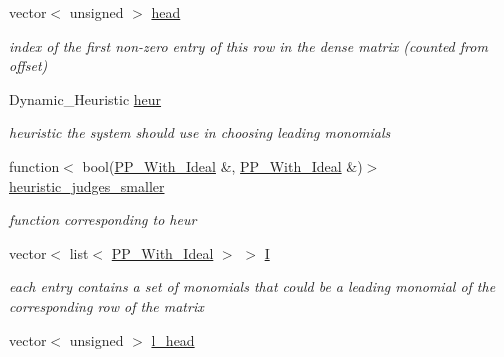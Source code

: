\begin{DoxyCompactItemize}
vector$<$ unsigned $>$ \hyperlink{group___g_b_computation_a1679f8bda319a602672bc866220bb7fb}{head}
\begin{DoxyCompactList}\small\item\em index of the first non-\/zero entry of this row in the dense matrix (counted from offset) \end{DoxyCompactList}\item 
\mbox{\label{group___g_b_computation_a31a62db75649e409aa5b9f374c260ba5}} 
Dynamic\+\_\+\+Heuristic \hyperlink{group___g_b_computation_a31a62db75649e409aa5b9f374c260ba5}{heur}
\begin{DoxyCompactList}\small\item\em heuristic the system should use in choosing leading monomials \end{DoxyCompactList}\item 
\mbox{\label{group___g_b_computation_afccb03cc2471080d322e6b68f763e24b}} 
function$<$ bool(\hyperlink{group___g_b_computation_class_dynamic___engine_1_1_p_p___with___ideal}{P\+P\+\_\+\+With\+\_\+\+Ideal} \&, \hyperlink{group___g_b_computation_class_dynamic___engine_1_1_p_p___with___ideal}{P\+P\+\_\+\+With\+\_\+\+Ideal} \&)$>$ \hyperlink{group___g_b_computation_afccb03cc2471080d322e6b68f763e24b}{heuristic\+\_\+judges\+\_\+smaller}
\begin{DoxyCompactList}\small\item\em function corresponding to {\ttfamily heur} \end{DoxyCompactList}\item 
\mbox{\label{group___g_b_computation_a1d3e35d9bf43d93ba740b6bd8f5237dd}} 
vector$<$ list$<$ \hyperlink{group___g_b_computation_class_dynamic___engine_1_1_p_p___with___ideal}{P\+P\+\_\+\+With\+\_\+\+Ideal} $>$ $>$ \hyperlink{group___g_b_computation_a1d3e35d9bf43d93ba740b6bd8f5237dd}{I}
\begin{DoxyCompactList}\small\item\em each entry contains a set of monomials that could be a leading monomial of the corresponding row of the matrix \end{DoxyCompactList}\item 
\mbox{\label{group___g_b_computation_a740d4262bc2b5fdfcf2bf23bf05bf866}} 
vector$<$ unsigned $>$ \hyperlink{group___g_b_computation_a740d4262bc2b5fdfcf2bf23bf05bf866}{l\+\_\+head}

\end{DoxyCompactItemize}
